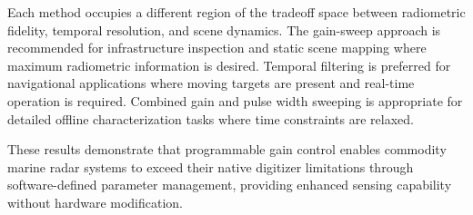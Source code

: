 \documentclass[colorlinks,upint,balance]{asmeconf}
\begin{document}
Each method occupies a different region of the tradeoff space between radiometric fidelity, temporal resolution, and scene dynamics. The gain-sweep approach is recommended for infrastructure inspection and static scene mapping where maximum radiometric information is desired. Temporal filtering is preferred for navigational applications where moving targets are present and real-time operation is required. Combined gain and pulse width sweeping is appropriate for detailed offline characterization tasks where time constraints are relaxed.

These results demonstrate that programmable gain control enables commodity marine radar systems to exceed their native digitizer limitations through software-defined parameter management, providing enhanced sensing capability without hardware modification.




\nocite{*}
\end{document}
